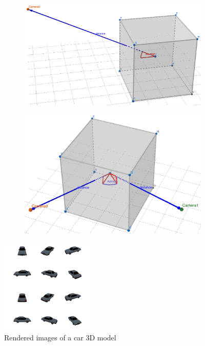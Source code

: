 \documentclass[a4paper,11pt,oneside]{article}
\begin{document}
\begin{figure}[H]
     \centering
     \begin{subfigure}{0.5\textwidth}
         \centering
         \includegraphics[width=\textwidth]{figures/multi1.png}
         \caption{}
         \label{fig:distelev}
     \end{subfigure}
     \hspace*{\fill}
     \begin{subfigure}{0.4\textwidth}
         \centering
         \includegraphics[width=\textwidth]{figures/multi2.png}
         \caption{}
         \label{fig:azim}
     \end{subfigure}
        \caption{}
        \label{fig:two}
\end{figure}
\begin{figure}[h]
  	\centering
  	\includegraphics[width=0.4\textwidth]{figures/render_car.png}
  	\caption{Rendered images of a car 3D model}
  	\label{fig:carrender}
\end{figure}
\end{document}
